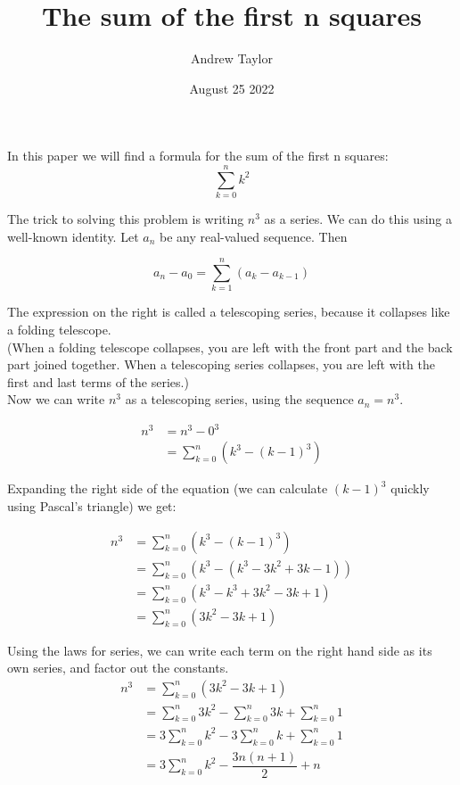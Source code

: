 \documentclass{article}
\title{The sum of the first n squares}
\author{Andrew Taylor}
\date{August 25 2022}
\begin{document}
\maketitle

In this paper we will find a formula for the sum of the first n squares: $$ \sum_{k=0}^{n} k^{2} $$

The trick to solving this problem is writing $n^3$ as a series. We can do this using a well-known identity. Let $a_n$ be any real-valued sequence. Then

\begin{equation*}
a_{n} - a_{0} = \sum_{k=1}^{n} \left( a_{k} - a_{k-1} \right)
\end{equation*}

The expression on the right is called a telescoping series, because it collapses like a folding telescope. \\

(When a folding telescope collapses, you are left with the front part and the back part joined together. When a telescoping series collapses, you are left with the first and last terms of the series.) \\

Now we can write $n^3$ as a telescoping series, using the sequence $a_{n} = n^{3}$.

\begin{align*}
n^3 &= n^3 - 0^3 \\
&= \sum_{k=0}^{n} \left( k^3 - (k-1)^3 \right)
\end{align*}

Expanding the right side of the equation (we can calculate $(k-1)^3$ quickly using Pascal's triangle) we get:

\begin{align*}
n^3 &= \sum_{k=0}^{n} \left( k^3 - (k-1)^3 \right) \\
&= \sum_{k=0}^{n} \left( k^3 - (k^3 - 3k^2 + 3k - 1) \right) \\
&= \sum_{k=0}^{n} \left( k^3 - k^3 + 3k^2 - 3k + 1 \right) \\
&= \sum_{k=0}^{n} \left( 3k^2 - 3k + 1 \right) 
\end{align*}

Using the laws for series, we can write each term on the right hand side as its own series, and factor out the constants. \\

\begin{align*}
n^3 &= \sum_{k=0}^{n} \left( 3k^2 - 3k + 1 \right) \\
&= \sum_{k=0}^{n} 3k^2 - \sum_{k=0}^{n} 3k + \sum_{k=0}^{n} 1 \\
&= 3 \sum_{k=0}^{n} k^2 - 3 \sum_{k=0}^{n} k + \sum_{k=0}^{n} 1 \\
&= 3 \sum_{k=0}^{n} k^2 - \dfrac{3n(n+1)}{2} + n \\
\end{align*}
\end{document}
